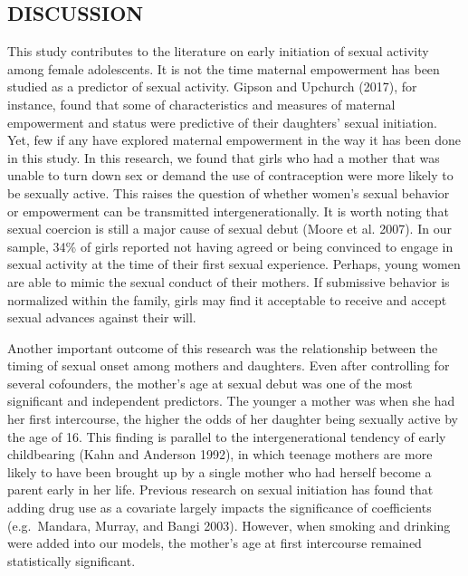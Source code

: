 \documentclass[
]{article}
\begin{document}
\hypertarget{discussion}{%
\subsection{DISCUSSION}\label{discussion}}

This study contributes to the literature on early initiation of sexual
activity among female adolescents. It is not the time maternal
empowerment has been studied as a predictor of sexual activity. Gipson
and Upchurch (2017), for instance, found that some of characteristics
and measures of maternal empowerment and status were predictive of their
daughters' sexual initiation. Yet, few if any have explored maternal
empowerment in the way it has been done in this study. In this research,
we found that girls who had a mother that was unable to turn down sex or
demand the use of contraception were more likely to be sexually active.
This raises the question of whether women's sexual behavior or
empowerment can be transmitted intergenerationally. It is worth noting
that sexual coercion is still a major cause of sexual debut (Moore et
al. 2007). In our sample, 34\% of girls reported not having agreed or
being convinced to engage in sexual activity at the time of their first
sexual experience. Perhaps, young women are able to mimic the sexual
conduct of their mothers. If submissive behavior is normalized within
the family, girls may find it acceptable to receive and accept sexual
advances against their will.

Another important outcome of this research was the relationship between
the timing of sexual onset among mothers and daughters. Even after
controlling for several cofounders, the mother's age at sexual debut was
one of the most significant and independent predictors. The younger a
mother was when she had her first intercourse, the higher the odds of
her daughter being sexually active by the age of 16. This finding is
parallel to the intergenerational tendency of early childbearing (Kahn
and Anderson 1992), in which teenage mothers are more likely to have
been brought up by a single mother who had herself become a parent early
in her life. Previous research on sexual initiation has found that
adding drug use as a covariate largely impacts the significance of
coefficients (e.g.~Mandara, Murray, and Bangi 2003). However, when
smoking and drinking were added into our models, the mother's age at
first intercourse remained statistically significant.
\end{document}
